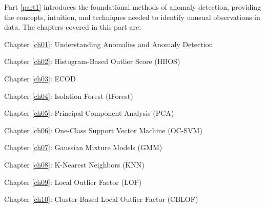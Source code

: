 \label{part1}
Part \ref{part1} introduces the foundational methods of anomaly detection, providing the concepts, intuition, and techniques needed to identify unusual observations in data. The chapters covered in this part are:

\begin{description}[leftmargin=1cm, labelindent=1cm, labelwidth=1cm, align=right, itemsep=0pt, font=\normalfont]
    \item Chapter \ref{ch01}: Understanding Anomalies and Anomaly Detection
    \item Chapter \ref{ch02}: Histogram-Based Outlier Score (HBOS)
    \item Chapter \ref{ch03}: ECOD
    \item Chapter \ref{ch04}: Isolation Forest (IForest)
    \item Chapter \ref{ch05}: Principal Component Analysis (PCA)
    \item Chapter \ref{ch06}: One-Class Support Vector Machine (OC-SVM)
    \item Chapter \ref{ch07}: Gaussian Mixture Models (GMM)
    \item Chapter \ref{ch08}: K-Nearest Neighbors (KNN)
    \item Chapter \ref{ch09}: Local Outlier Factor (LOF)
    \item Chapter \ref{ch10}: Cluster-Based Local Outlier Factor (CBLOF)


\end{description}
